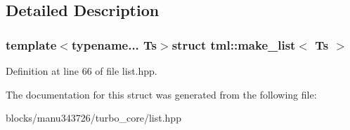 \subsection{Detailed Description}
\subsubsection*{template$<$typename... Ts$>$struct tml\+::make\+\_\+list$<$ Ts $>$}



Definition at line 66 of file list.\+hpp.



The documentation for this struct was generated from the following file\+:\begin{DoxyCompactItemize}
\item 
blocks/manu343726/turbo\+\_\+core/list.\+hpp\end{DoxyCompactItemize}
